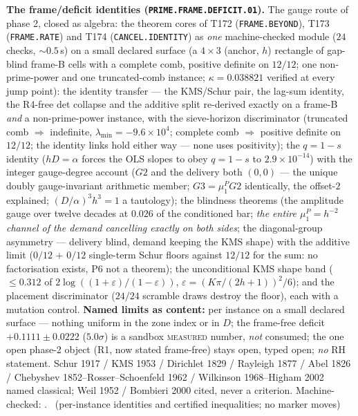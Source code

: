 \documentclass[11pt,a4paper]{article}
\theoremstyle{definition}
\begin{document}
\par\smallskip\noindent\textbf{The frame/deficit identities
(\texttt{PRIME.FRAME.DEFICIT.01}).}
The gauge route of phase 2, closed as algebra: the theorem cores of
T172 (\texttt{FRAME.BEYOND}), T173 (\texttt{FRAME.RATE}) and T174
(\texttt{CANCEL.IDENTITY}) as \emph{one} machine-checked module ($24$
checks, ${\sim}0.5$\,s) on a small declared surface (a $4\times3$
(anchor, $h$) rectangle of gap-blind frame-B cells with a complete
comb, positive definite on $12/12$; one non-prime-power and one
truncated-comb instance; $\kappa=0.038821$ verified at every jump
point): the identity transfer --- the KMS/Schur pair, the lag-sum
identity, the R4-free det collapse and the additive split re-derived
exactly on a frame-B \emph{and} a non-prime-power instance, with the
sieve-horizon discriminator (truncated comb $\Rightarrow$ indefinite,
$\lambda_{\min}=-9.6\times10^{4}$; complete comb $\Rightarrow$ positive
definite on $12/12$; the identity links hold either way --- none uses
positivity); the $q=1-s$ identity ($hD=\alpha$ forces the OLS slopes to
obey $q=1-s$ to $2.9\times10^{-14}$) with the integer gauge-degree
account ($G2$ and the delivery both $(0,0)$ --- the unique doubly
gauge-invariant arithmetic member; $G3=\mu^P_1G2$ identically, the
offset-$2$ explained; $(D/\alpha)^3h^3=1$ a tautology); the blindness
theorems (the amplitude gauge over twelve decades at $0.026$ of the
conditioned bar; \emph{the entire $\mu^P_1=h^{-2}$ channel of the
demand cancelling exactly on both sides}; the diagonal-group asymmetry
--- delivery blind, demand keeping the KMS shape) with the additive
limit ($0/12$ $+$ $0/12$ single-term Schur floors against $12/12$ for
the sum: no factorisation exists, P6 not a theorem); the unconditional
KMS shape band ($\le0.312$ of $2\log((1+\varepsilon)/(1-\varepsilon))$,
$\varepsilon=(K\pi/(2h+1))^2/6$); and the placement discriminator
($24/24$ scramble draws destroy the floor), each with a mutation
control.
\textbf{Named limits as content:} per instance on a small declared
surface --- nothing uniform in the zone index or in $D$; the frame-free
deficit $+0.1111\pm0.0222$ ($5.0\sigma$) is a sandbox
\textsc{measured} number, \emph{not} consumed; the one open phase-2
object (R1, now stated frame-free) stays open, typed open; \emph{no} RH
statement. Schur 1917 / KMS 1953 / Dirichlet 1829 / Rayleigh 1877 /
Abel 1826 / Chebyshev 1852--Rosser--Schoenfeld 1962 / Wilkinson
1968--Higham 2002 named classical; Weil 1952 / Bombieri 2000 cited,
never a criterion. Machine-checked:
.
\mE\ (per-instance identities and certified inequalities; no marker moves)
\par\smallskip
\end{document}

